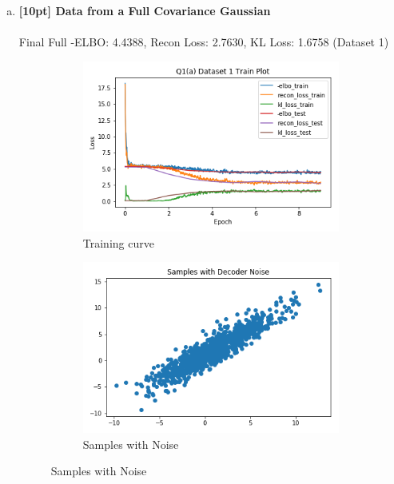 \documentclass{article}
\begin{document}
\begin{enumerate}[(a)]

\item {\bf [10pt] Data from a Full Covariance Gaussian} \\\\
Final Full -ELBO: 4.4388, Recon Loss: 2.7630, KL Loss: 1.6758 (Dataset 1)
\begin{figure}[H]
    \centering
    \begin{subfigure}{0.32\textwidth}
        \centering
        \includegraphics[width=\textwidth]{figures/q1_a_dset1_train_plot.png}
        \caption{Training curve}
    \end{subfigure}
    \begin{subfigure}{0.32\textwidth}
        \centering
        \includegraphics[width=\textwidth]{figures/q1_a_dset1_sample_with_noise.png}
        \caption{Samples with Noise}
    \end{subfigure}

\end{figure}
\end{enumerate}
\end{document}
